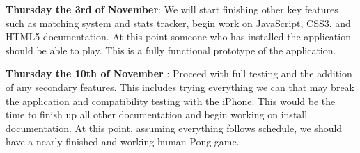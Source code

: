 \documentclass[12pt]{article}
\begin{document}
\begin{description}
\item \textbf{Thursday the 3rd of November}: We will start finishing other key features such as matching system and stats tracker, begin work on JavaScript, CSS3, and HTML5 documentation. At this point someone who has
installed the application should be able to play. This is a fully functional prototype of the application.

\item \textbf{Thursday the 10th of November }: Proceed with full testing and the addition of any secondary features. This includes trying everything we can that may break the application and
compatibility testing with the iPhone. This would be the time to finish up all other documentation and
begin working on install documentation. At this point, assuming everything follows schedule, we should
have a nearly finished and working human Pong game.
\end{description}
\end{document}
